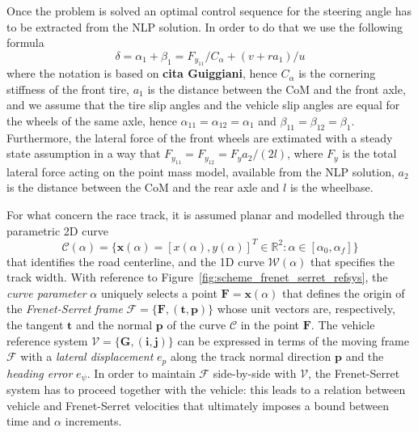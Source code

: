 \documentclass[conference]{IEEEtran} %
\renewcommand{\vec}[1]{\boldsymbol{#1}}
\begin{document}
Once the problem is solved an optimal control sequence for the steering angle has to be extracted from the NLP solution. In order to do that we use the following formula
\begin{equation}
\delta = \alpha_{1} + \beta_1 = F_{y_{11}}/C_\alpha + (v + ra_1)/u
\end{equation}
where the notation is based on \textbf{cita Guiggiani}, hence $C_\alpha$ is the cornering stiffness of the front tire, $a_1$ is the distance between the CoM and the front axle, and we assume that the tire slip angles and the vehicle slip angles are equal for the wheels of the same axle, hence $\alpha_{11} = \alpha_{12} = \alpha_{1}$ and  $\beta_{11} = \beta_{12} = \beta_{1}$.
Furthermore, the lateral force of the front wheels are extimated with a steady state assumption in a way that $F_{y_{11}} = F_{y_{12}} = F_{y}a_2/(2l)$, where $F_{y}$ is the total lateral force acting on the point mass model, available from the NLP solution, $a_2$ is the distance between the CoM and the rear axle and $l$ is the wheelbase.



For what concern the race track, it is assumed planar and modelled through the parametric 2D curve
\begin{equation}
\mathcal C(\alpha) = \{ \vec x (\alpha) = [x(\alpha), y(\alpha)]^T \in \mathbb{R}^2 : \alpha \in [\alpha_0, \alpha_f] \}
\end{equation}
%
that identifies the road centerline, and the 1D curve $\mathcal W(\alpha)$ that specifies the track width.
With reference to Figure~\ref{fig:scheme_frenet_serret_refsys}, the \emph{curve parameter} $\alpha$ uniquely selects a point $\vec F = \vec x(\alpha)$ that defines the origin of the \emph{Frenet-Serret frame} $\mathcal F = \{ \vec F, (\vec t, \vec p) \}$ whose unit vectors are, respectively, the tangent $\vec t$ and the normal $\vec p$ of the curve $\mathcal C$ in the point $\vec F$.
%
The vehicle reference system $\mathcal V = \{ \vec G, (\vec i, \vec j) \}$ can be expressed in terms of the moving frame $\mathcal F$ with a \emph{lateral displacement} $e_p$ along the track normal direction $\vec p$ and the \emph{heading error} $e_\psi$.
In order to maintain $\mathcal F$ side-by-side with $\mathcal V$, the Frenet-Serret system has to proceed together with the vehicle: this leads to a relation between vehicle and Frenet-Serret velocities that ultimately imposes a bound between time and $\alpha$ increments.
\end{document}
